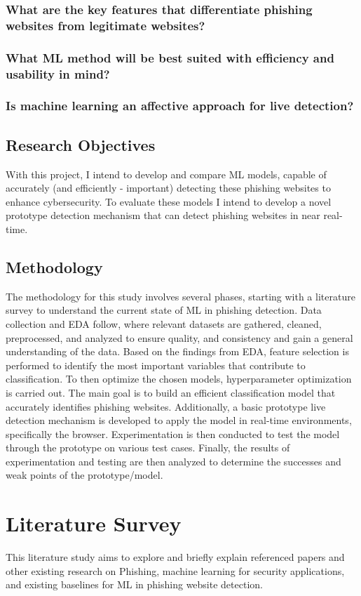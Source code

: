 \documentclass{sigkddExp}
\begin{document}
\subsubsection{What are the key features that differentiate phishing websites from legitimate websites?}
\label{rq_1}
\subsubsection{What ML method will be best suited with efficiency and usability in mind?}
\label{rq_1}
\subsubsection{Is machine learning an affective approach for live detection?}
\label{rq_2}
\subsection{Research Objectives}
\label{research_objs}
With this project, I intend to develop and compare ML models, capable of accurately (and efficiently - important) detecting these phishing websites to enhance cybersecurity. To evaluate these models I intend to develop a novel prototype detection mechanism that can detect phishing websites in near real-time.
\subsection{Methodology}
The methodology for this study involves several phases, starting with a literature survey to understand the current state of ML in phishing detection. Data collection and EDA follow, where relevant datasets are gathered, cleaned, preprocessed, and analyzed to ensure quality, and consistency and gain a general understanding of the data. Based on the findings from EDA, feature selection is performed to identify the most important variables that contribute to classification. To then optimize the chosen models, hyperparameter optimization is carried out. The main goal is to build an efficient classification model that accurately identifies phishing websites. Additionally, a basic prototype live detection mechanism is developed to apply the model in real-time environments, specifically the browser. Experimentation is then conducted to test the model through the prototype on various test cases. Finally, the results of experimentation and testing are then analyzed to determine the successes and weak points of the prototype/model.

\section{Literature Survey}
This literature study aims to explore and briefly explain referenced papers and other existing research on Phishing, machine learning for security applications, and existing baselines for ML in phishing website detection.
\end{document}
